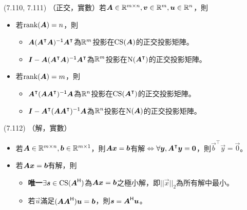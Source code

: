 \item \begin{theorem}{(7.110, 7.111)} （正交，實數）若$\boldsymbol{A} \in \mathbb{R}^{m \times n}, \boldsymbol{v} \in \mathbb{R}^{m}, \boldsymbol{u} \in \mathbb{R}^{n}$，則
	\begin{itemize}
		\item 若$\operatorname{rank}(\boldsymbol{A}) = n$，則
			\begin{itemize}
				\item $\boldsymbol{A}(\boldsymbol{A}^{\intercal}\boldsymbol{A})^{\mathsf{-1}}\boldsymbol{A}^{\intercal}$為$\mathbb{R}^m$投影在$\operatorname{CS}(\boldsymbol{A})$的正交投影矩陣。
				\item $\boldsymbol{I} - \boldsymbol{A}(\boldsymbol{A}^{\intercal}\boldsymbol{A})^{\mathsf{-1}}\boldsymbol{A}^{\intercal}$為$\mathbb{R}^m$投影在$\operatorname{N}(\boldsymbol{A}^\intercal)$的正交投影矩陣。
			\end{itemize}
		\item 若$\operatorname{rank}(\boldsymbol{A}) = m$，則
			\begin{itemize}
				\item $\boldsymbol{A}^\intercal(\boldsymbol{A}\boldsymbol{A}^{\intercal})^{\mathsf{-1}}\boldsymbol{A}$為$\mathbb{R}^n$投影在$\operatorname{CS}(\boldsymbol{A}^\intercal)$的正交投影矩陣。
				\item $\boldsymbol{I} - \boldsymbol{A}^\intercal(\boldsymbol{A}\boldsymbol{A}^{\intercal})^{\mathsf{-1}}\boldsymbol{A}$為$\mathbb{R}^n$投影在$\operatorname{N}(\boldsymbol{A})$的正交投影矩陣。
			\end{itemize}
	\end{itemize}
\end{theorem}

\item \begin{theorem}{(7.112)} （解，實數）
	\begin{itemize}
		\item 若$\boldsymbol{A} \in \mathbb{R}^{m \times n}, \boldsymbol{b} \in \mathbb{R}^{m \times 1}$，則$\boldsymbol{A}\boldsymbol{x} = \boldsymbol{b}$有解$\iff$$\forall \boldsymbol{y}, \boldsymbol{A}^\intercal\boldsymbol{y} = \boldsymbol{0}$，則$\vec{b}^\intercal\vec{y} = \vec{0}$。
		\item 若$\boldsymbol{A}\boldsymbol{x} = \boldsymbol{b}$有解，則
			\begin{itemize}
				\item \textbf{唯一}$\exists \boldsymbol{s} \in \operatorname{CS}(\boldsymbol{A}^{\mathsf{H}})$為$\boldsymbol{A}\boldsymbol{x} = \boldsymbol{b}$之極小解，即$||\vec{x}||_2$為所有解中最小。
				\item 若$\vec{u}$滿足$(\boldsymbol{AA}^{\mathsf{H}})\boldsymbol{u} = \boldsymbol{b}$，則$\boldsymbol{s} = \boldsymbol{A}^{\mathsf{H}}\boldsymbol{u}$。
			\end{itemize}
	\end{itemize}
\end{theorem}
